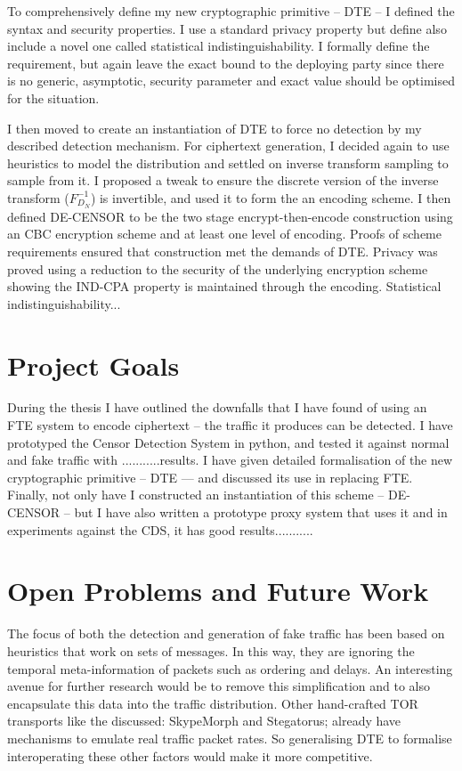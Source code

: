 \documentclass[ %
                    author={Samuel Russell},
                supervisor={Prof. Bogdan Warinschi},
                    degree={MEng},
                     title={Innocuous Ciphertexts},
                  subtitle={The DE-CENSOR Scheme},
                      type={Research},
                      year={2018} ]{dissertation}
\begin{document}
To comprehensively define my new cryptographic primitive -- DTE -- I defined the syntax and security properties.
I use a standard privacy property but define also include a novel one called statistical indistinguishability. I formally define the requirement, but again leave the exact bound to the deploying party since there is no generic, asymptotic, security parameter and exact value should be optimised for the situation.

I then moved to create an instantiation of DTE to force no detection by my described detection mechanism.
For ciphertext generation, I decided again to use heuristics to model the distribution and settled on inverse transform sampling to sample from it.
I proposed a tweak to ensure the discrete version of the inverse transform  ($F^{-1}_{D_N}$) is invertible, and used it to form the an encoding scheme.
I then defined DE-CENSOR to be the two stage encrypt-then-encode construction using an CBC encryption scheme and at least one level of encoding.
Proofs of scheme requirements ensured that construction met the demands of DTE.
Privacy was proved using a reduction to the security of the underlying encryption scheme showing the IND-CPA property is maintained through the encoding.
Statistical indistinguishability...

\section{Project Goals}

During the thesis I have outlined the downfalls that I have found of using an FTE system to encode ciphertext -- the traffic it produces can be detected.
I have prototyped the Censor Detection System in python, and tested it against normal and fake traffic with ...........results.
I have given detailed formalisation of the new cryptographic primitive -- DTE --- and discussed its use in replacing FTE.
Finally, not only have I constructed an instantiation of this scheme -- DE-CENSOR -- but I have also written a prototype proxy system that uses it and in experiments against the CDS, it has good results...........

\section{Open Problems and Future Work}

The focus of both the detection and generation of fake traffic has been based on heuristics that work on sets of messages. In this way, they are ignoring the temporal meta-information of packets such as ordering and delays. An interesting avenue for further research would be to remove this simplification and to also encapsulate this data into the traffic distribution. Other hand-crafted TOR transports like the discussed: SkypeMorph and Stegatorus; already have mechanisms to emulate real traffic packet rates. So generalising DTE to formalise interoperating these other factors would make it more competitive.
\end{document}
